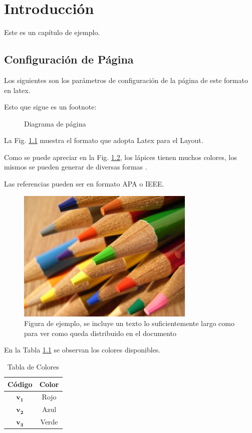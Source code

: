 \chapter{Introducción} \label{intro}
Este es un capítulo de ejemplo.
\section{Configuración de Página}
Los siguientes son los parámetros de configuración de la página de este formato en latex.
\pagevalues

Esto que sigue es un footnote: %
%
\begin{figure}
	\pagediagram
	\caption{Diagrama de página}
	\label{fig1_intro}
\end{figure}

La Fig. \ref{fig1_intro} muestra el formato que adopta Latex para el Layout.

Como se puede apreciar en la Fig. \ref{fig2_intro}, los lápices tienen muchos colores, los mismos se pueden generar de diversas formas \cite{ejemplo}.

Las referencias pueden ser en formato APA o IEEE.

\begin{figure}[htb]
	\centering
	\includegraphics[width=8.5cm]{figs/chapter1/sample.jpg}
	\caption[Figura de ejemplo]{Figura de ejemplo, se incluye un texto lo suficientemente largo como para ver como queda distribuido en el documento}
	\label{fig2_intro}
\end{figure}

\lipsum[15-18]

En la Tabla \ref{table1_intro} se observan los colores disponibles.
\begin{table}[htb]
\renewcommand{\arraystretch}{1.3}
	\caption{Tabla de Colores}
	\label{table1_intro}
	\centering
	\setlength\tabcolsep{2pt}
	\begin{tabular}{c c}
		\hline
		\bfseries Código & \bfseries Color\\
		\hline
		$\mathbf{v_1}$ & Rojo\\
		$\mathbf{v_2}$ & Azul\\
		$\mathbf{v_3}$ & Verde\\
		\hline
	\end{tabular}
\end{table}


